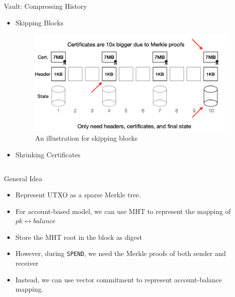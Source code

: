 \documentclass[biblatex,aspectratio=169,11pt]{mybeamer}
\begin{document}
\begin{frame}{Vault: Compressing History}
  \begin{itemize}
    \item Skipping Blocks
    \begin{figure}
      \includegraphics[width=0.5\linewidth]{figs/skip-block.png}
      \caption{An illustration for skipping blocks}
    \end{figure}
    \item Shrinking Certificates
  \end{itemize}
\end{frame}

\subsection{}



\begin{frame}{General Idea}
  \begin{itemize}
    \item Represent UTXO as a sparse Merkle tree.
    \item For account-based model, we can use MHT to represent the mapping of $pk \leftrightarrow balance$
    \item Store the MHT root in the block as digest
    \item However, during \texttt{SPEND}, we need the Merkle proofs of both sender and receiver
    \item Instead, we can use \alert{vector commitment} to represent account-balance mapping.
  \end{itemize}
\end{frame}
\end{document}

